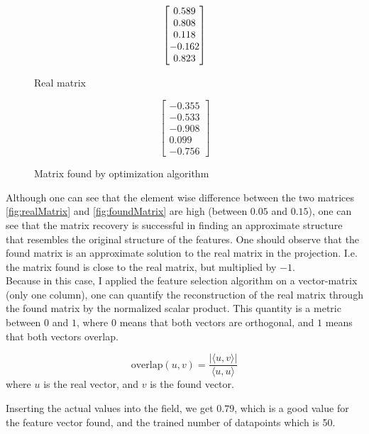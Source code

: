 \def\okW1{
\begin{bmatrix}
	-0.355 \\
    	-0.533 \\
    	-0.908 \\
    	0.099 \\
    -0.756 
\end{bmatrix}}

\begin{figure}[h] 
\begin {minipage}{0.47\textwidth}
  \centering
  \begin{equation} \label{fig:realMatrix}
    \begin{bmatrix} 0.589 \\ 0.808 \\ 0.118 \\ -0.162 \\ 0.823 \end{bmatrix}
  \end{equation}
  \caption{Real matrix}
\end{minipage}
\hfill
\begin {minipage}{0.47\textwidth}
  \centering
  \begin{equation} \label{fig:foundMatrix}
    \okW1
  \end{equation}
  \caption{Matrix found by optimization algorithm}
\end{minipage}
\end{figure}

Although one can see that the element wise difference between the two matrices \ref{fig:realMatrix} and \ref{fig:foundMatrix} are high (between $0.05$ and $0.15$), one can see that the matrix recovery is successful in finding an approximate structure that resembles the original structure of the features.
One should observe that the found matrix is an approximate solution to the real matrix in the projection. I.e. the matrix found is close to the real matrix, but multiplied by $-1$. \\

Because in this case, I applied the feature selection algorithm on a vector-matrix (only one column), one can quantify the reconstruction of the real matrix through the found matrix by the normalized scalar product.
This quantity is a metric between $0$ and $1$, where $0$ means that both vectors are orthogonal, and $1$ means that both vectors overlap.

\begin{equation}
\text{overlap}(u, v) = \frac{| \langle u, v \rangle |}{\langle u, u \rangle}
\end{equation}
where $u$ is the real vector, and $v$ is the found vector.

Inserting the actual values into the field, we get $0.79$, which is a good value for the feature vector found, and the trained number of datapoints which is 50. \\
 
